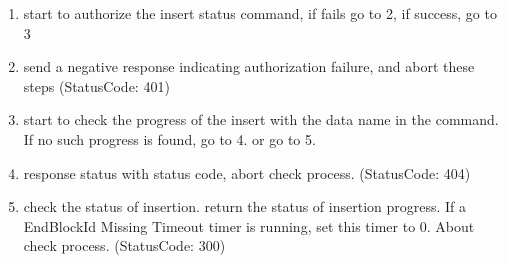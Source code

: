 \documentclass{acm_proc_article-sp}
\begin{document}
\begin{enumerate}

\item start to authorize the insert status command, if fails go to 2, if success, go to 3

\item send a negative response indicating authorization failure, and abort these steps (StatusCode: 401)

\item start to check the progress of the insert with the data name in the command. If no such progress is found, go to 4. or go to 5.

\item response status with status code, abort check process. (StatusCode: 404)

\item check the status of insertion. return the status of insertion progress. If a EndBlockId Missing Timeout timer is running, set this timer to 0. About check process. (StatusCode: 300)

\end{enumerate}
\end{document}
